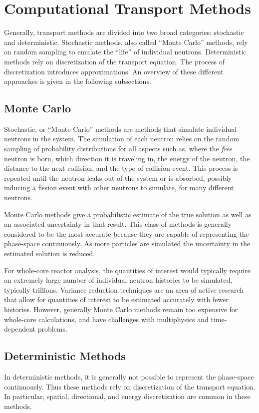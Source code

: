 {  \section{Computational Transport Methods}{\label{sec:NTT:Computational Methods}
    Generally, transport methods are divided into two broad categories: stochastic and deterministic.
    Stochastic methods, also called ``Monte Carlo'' methods, rely on random sampling to emulate the ``life'' of individual neutrons.
    Deterministic methods rely on discretization of the transport equation.
    The process of discretization introduces approximations.
    An overview of these different approaches is given in the following subsections.

    \subsection{Monte Carlo}{\label{ssec:NTT:Monte Carlo}
      Stochastic, or ``Monte Carlo'' methods are methods that simulate individual neutrons in the system.
      The simulation of each neutron relies on the random sampling of probability distributions for all aspects such as, where the \emph{free} neutron is born, which direction it is traveling in, the energy of the neutron, the distance to the next collision, and the type of collision event.
      This process is repeated until the neutron leaks out of the system or is absorbed, possibly inducing a fission event with other neutrons to simulate, for many different neutrons.

      Monte Carlo methods give a probabilistic estimate of the true solution as well as an associated uncertainty in that result.
      This class of methods is generally considered to be the most accurate because they are capable of representing the phase-space continuously.
      As more particles are simulated the uncertainty in the estimated solution is reduced.

      For whole-core reactor analysis, the quantities of interest would typically require an extremely large number of individual neutron histories to be simulated, typically trillions.
      Variance reduction techniques are an area of active research that allow for quantities of interest to be estimated accurately with fewer histories. %
      However, generally Monte Carlo methods remain too expensive for whole-core calculations, and have challenges with multiphysics and time-dependent problems.
    }

    \subsection{Deterministic Methods}{\label{ssec:NTT:Deterministic Methods}
      In deterministic methods, it is generally not possible to represent the phase-space continuously.
      Thus these methods rely on discretization of the transport equation.
      In particular, spatial, directional, and energy discretization are common in these methods.
      
}}}
